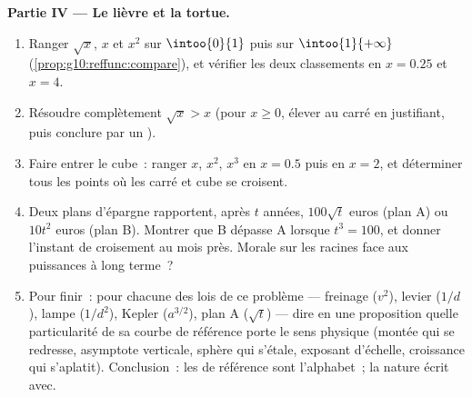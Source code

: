\begin{problem}
\medskip
\noindent\textbf{Partie IV --- Le lièvre et la tortue.}
\begin{enumerate}[resume]
  \item Ranger $\sqrt x$, $x$ et $x^2$ sur $\intoo{0}{1}$ puis sur
        $\intoo{1}{+\infty}$ (\cref{prop:g10:reffunc:compare}), et
        vérifier les deux classements en $x = 0.25$ et $x = 4$.
  \item Résoudre complètement $\sqrt x > x$ (pour $x \geq 0$, élever
        au carré en justifiant, puis conclure par un ).
  \item Faire entrer le cube~: ranger $x$, $x^2$, $x^3$ en
        $x = 0.5$ puis en $x = 2$, et déterminer tous les points où
        les  carré et cube se croisent.
  \item Deux plans d'épargne rapportent, après $t$ années,
        $100\sqrt t$ euros (plan A) ou $10 t^2$ euros (plan B).
        Montrer que B dépasse A lorsque $t^3 = 100$, et donner
        l'instant de croisement au mois près. Morale sur les racines
        face aux puissances à long terme~?
  \item Pour finir~: pour chacune des lois de ce problème ---
        freinage ($v^2$), levier ($1/d$), lampe ($1/d^2$), Kepler
        ($a^{3/2}$), plan A ($\sqrt t$) --- dire en une proposition
        quelle particularité de sa courbe de référence porte le sens
        physique (montée qui se redresse, asymptote verticale,
        sphère qui s'étale, exposant d'échelle, croissance qui
        s'aplatit). Conclusion~: les  de référence sont
        l'alphabet~; la nature écrit avec.
\end{enumerate}
\end{problem}
